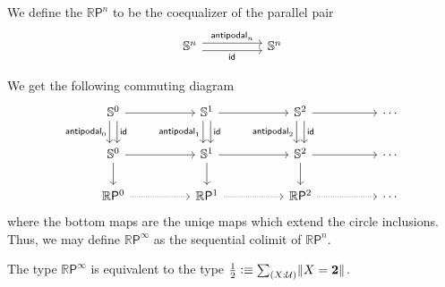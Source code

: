 \documentclass{article}
\newcommand{\projective}[1]{\mathbb{R}\mathsf{P}^{#1}}
\newcommand{\antipodal}[1]{\mathsf{antipodal}_{#1}}
\begin{document}
\begin{defn}
We define the  $\projective{n}$ to be the coequalizer of the parallel pair
\begin{equation*}
\begin{tikzcd}[column sep=huge]
\Sn^n\arrow[r,yshift=.7ex,"\antipodal{n}"] \arrow[r,yshift=-.7ex,swap,"\idfunc"] & \Sn^n
\end{tikzcd}
\end{equation*}
\end{defn}

\begin{defn}
We get the following commuting diagram
\begin{equation*}
\begin{tikzcd}[column sep=huge]
\Sn^0 \arrow[r] \arrow[d,xshift=-.7ex,swap,"\mathsf{antipodal}_0"] \arrow[d,xshift=.7ex,"\idfunc"]
& \Sn^1 \arrow[r] \arrow[d,xshift=-.7ex,swap,"\mathsf{antipodal}_1"] \arrow[d,xshift=.7ex,"\idfunc"]
& \Sn^2 \arrow[r] \arrow[d,xshift=-.7ex,swap,"\mathsf{antipodal}_2"] \arrow[d,xshift=.7ex,"\idfunc"]
& \cdots \\
\Sn^0 \arrow[r] \arrow[d] & \Sn^1 \arrow[r] \arrow[d] & \Sn^2 \arrow[r] \arrow[d] & \cdots \\
\projective{0} \arrow[r,densely dotted] & \projective{1} \arrow[r,densely dotted] & \projective{2} \arrow[r,densely dotted] & \cdots
\end{tikzcd}
\end{equation*}
where the bottom maps are the uniqe maps which extend the circle inclusions.
Thus, we may define $\projective{\infty}$ as the sequential colimit of $\projective{n}$. 
\end{defn}

\begin{conj}
The type $\projective{\infty}$ is equivalent to the type $\frac{1}{2}\defeq\sm{X:\UU}\brck{X=\bool}$. 
\end{conj}
\end{document}
